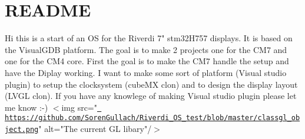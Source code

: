 \chapter{README}
\hypertarget{md__r_e_a_d_m_e}{}\label{md__r_e_a_d_m_e}
Hi this is a start of an OS for the Riverdi 7"{} stm32\+H757 displays.  \+It is based on the Visual\+GDB platform. The goal is to make 2 projects one for the CM7 and one for the CM4 core. First the goal is to make the CM7 handle the setup and have the Diplay working.  \+I want to make some sort of platform (\+Visual studio plugin) to setup the clocksystem (cube\+MX clon) and to design the display layout (\+LVGL clon). If you have any knowlege of making Visual studio plugin please let me know \+:-\/)  $<$img src="{}\href{https://github.com/SorenGullach/Riverdi_OS_test/blob/master/classgl_object.png}{\texttt{ https\+://github.\+com/\+Soren\+Gullach/\+Riverdi\+\_\+\+OS\+\_\+test/blob/master/classgl\+\_\+object.\+png}}"{} alt="{}The current GL libary"{}/\texorpdfstring{$>$}{>} 